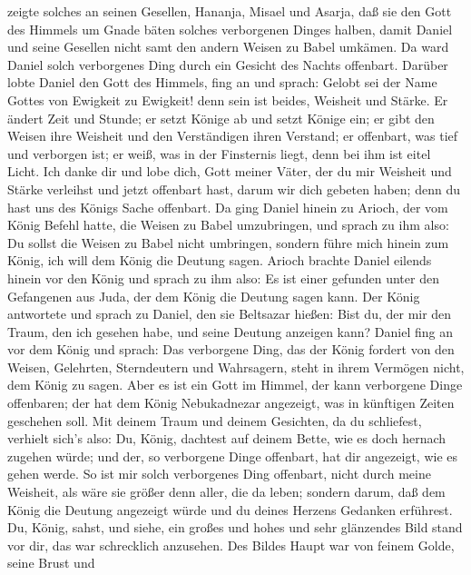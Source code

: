 zeigte solches an seinen Gesellen, Hananja, Misael und Asarja,
 daß sie den Gott des Himmels um Gnade bäten solches
verborgenen Dinges halben, damit Daniel und seine Gesellen nicht samt
den andern Weisen zu Babel umkämen.  Da ward Daniel solch
verborgenes Ding durch ein Gesicht des Nachts offenbart. 
Darüber lobte Daniel den Gott des Himmels, fing an und sprach: Gelobt
sei der Name Gottes von Ewigkeit zu Ewigkeit! denn sein ist beides,
Weisheit und Stärke.  Er ändert Zeit und Stunde; er setzt
Könige ab und setzt Könige ein; er gibt den Weisen ihre Weisheit und den
Verständigen ihren Verstand;  er offenbart, was tief und
verborgen ist; er weiß, was in der Finsternis liegt, denn bei ihm ist
eitel Licht.  Ich danke dir und lobe dich, Gott meiner
Väter, der du mir Weisheit und Stärke verleihst und jetzt offenbart
hast, darum wir dich gebeten haben; denn du hast uns des Königs Sache
offenbart.  Da ging Daniel hinein zu Arioch, der vom König
Befehl hatte, die Weisen zu Babel umzubringen, und sprach zu ihm also:
Du sollst die Weisen zu Babel nicht umbringen, sondern führe mich hinein
zum König, ich will dem König die Deutung sagen.  Arioch
brachte Daniel eilends hinein vor den König und sprach zu ihm also: Es
ist einer gefunden unter den Gefangenen aus Juda, der dem König die
Deutung sagen kann.  Der König antwortete und sprach zu
Daniel, den sie Beltsazar hießen: Bist du, der mir den Traum, den ich
gesehen habe, und seine Deutung anzeigen kann?  Daniel fing
an vor dem König und sprach: Das verborgene Ding, das der König fordert
von den Weisen, Gelehrten, Sterndeutern und Wahrsagern, steht in ihrem
Vermögen nicht, dem König zu sagen.  Aber es ist ein Gott
im Himmel, der kann verborgene Dinge offenbaren; der hat dem König
Nebukadnezar angezeigt, was in künftigen Zeiten geschehen soll.
 Mit deinem Traum und deinem Gesichten, da du schliefest,
verhielt sich's also: Du, König, dachtest auf deinem Bette, wie es doch
hernach zugehen würde; und der, so verborgene Dinge offenbart, hat dir
angezeigt, wie es gehen werde.  So ist mir solch
verborgenes Ding offenbart, nicht durch meine Weisheit, als wäre sie
größer denn aller, die da leben; sondern darum, daß dem König die
Deutung angezeigt würde und du deines Herzens Gedanken erführest.
 Du, König, sahst, und siehe, ein großes und hohes und sehr
glänzendes Bild stand vor dir, das war schrecklich anzusehen.
 Des Bildes Haupt war von feinem Golde, seine Brust und
